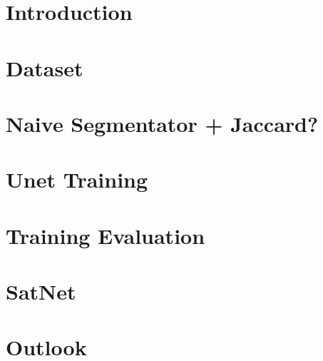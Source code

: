\documentclass[twoside,12pt]{report}
\begin{document}



\newpage
\thispagestyle{empty}\null\newpage



\tableofcontents

\thispagestyle{empty}\null\newpage

\chapter{Introduction}

\chapter{Dataset}

\chapter{Naive Segmentator + Jaccard?}

\chapter{Unet Training}

\chapter{Training Evaluation}

\clearpage

\chapter{SatNet}


\chapter{Outlook}


% 
\end{document}
